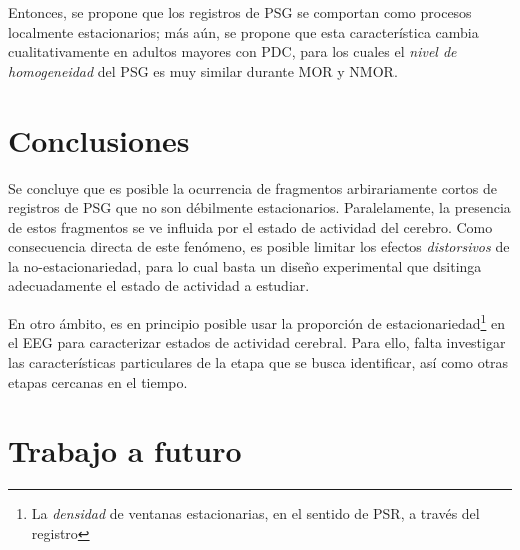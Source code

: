 Entonces, se propone que los registros de PSG se comportan como procesos localmente estacionarios; 
más aún, se propone que esta característica cambia cualitativamente en adultos mayores con PDC,
para los cuales el \textit{nivel de homogeneidad} del PSG es muy similar durante MOR y NMOR.


\section{Conclusiones}

Se concluye que
es posible la ocurrencia de fragmentos arbirariamente cortos de registros de PSG que no 
son débilmente estacionarios. Paralelamente, la presencia de estos fragmentos se ve influida por el
estado de actividad del cerebro.
%
Como consecuencia directa de este fenómeno, es posible limitar los efectos \textit{distorsivos} de 
la no-estacionariedad, para lo cual basta un diseño experimental que dsitinga adecuadamente el
estado de actividad a estudiar. 

En otro ámbito, es en principio posible usar la
proporción de estacionariedad\footnote{La \textit{densidad} de ventanas estacionarias, en el sentido de
PSR, a través del registro} en el EEG para caracterizar estados de actividad cerebral. Para ello, falta 
investigar las características particulares de la etapa que se busca identificar, así como otras
etapas cercanas en el tiempo.


\section{Trabajo a futuro}

